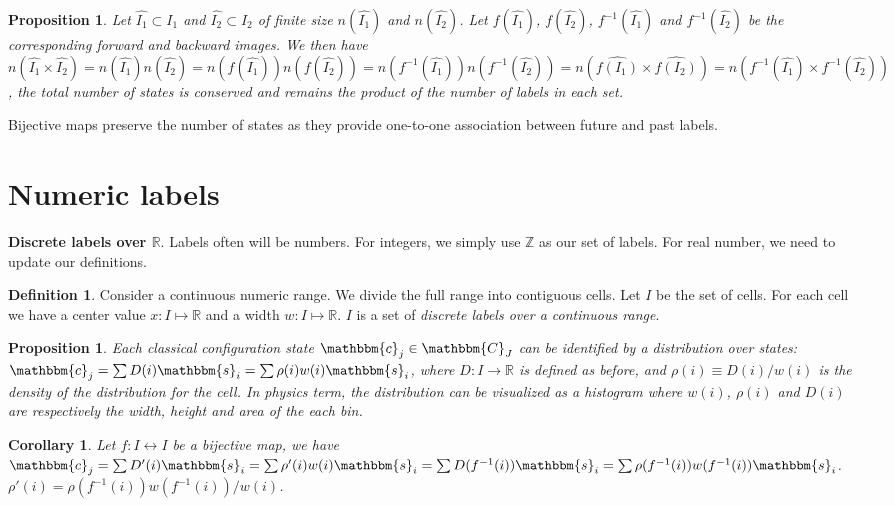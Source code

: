 \documentclass[twocolumn,floatfix,nofootinbib]{revtex4}   %
\theoremstyle{theorem}
\newtheorem{cor}[thm]{Corollary}
\newtheorem{prop}[thm]{Proposition}
\theoremstyle{definition}
\newtheorem{defn}[thm]{Definition}
\begin{document}
\begin{prop}\label{labelsMultiCount}
Let $\hat{I_1} \subset I_1$ and $\hat{I_2} \subset I_2$ of finite size $n(\hat{I_1})$ and $n(\hat{I_2})$. Let $f(\hat{I_1})$, $f(\hat{I_2})$, $f^{-1}(\hat{I_1})$ and $f^{-1}(\hat{I_2})$ be the corresponding forward and backward images. We then have $n(\hat{I_1}\times\hat{I_2})=n(\hat{I_1})n(\hat{I_2})=n(f(\hat{I_1})) n(f(\hat{I_2}))=n(f^{-1}(\hat{I_1})) n(f^{-1}(\hat{I_2}))=n(\hat{f(I_1)}\times\hat{f(I_2)})=n(f^{-1}(\hat{I_1})\times f^{-1}(\hat{I_2}))$, the total number of states is conserved and remains the product of the number of labels in each set.
\end{prop}

Bijective maps preserve the number of states as they provide one-to-one association between future and past labels.

\section{Numeric labels}

\textbf{Discrete labels over $\mathbb{R}$}. Labels often will be numbers. For integers, we simply use $\mathbb{Z}$ as our set of labels. For real number, we need to update our definitions.

\begin{defn}\label{disclabelsoverr}
Consider a continuous numeric range. We divide the full range into contiguous cells. Let $I$ be the set of cells. For each cell we have a center value $x: I \mapsto \mathbb{R}$ and a width $w: I \mapsto \mathbb{R}$. $I$ is a set of \emph{discrete labels over a continuous range}.
\end{defn}

\begin{prop}\label{disclabelsoverrdist}
Each classical configuration state $\mathbbm{c}_j \in \mathbbm{C}_J$ can be identified by a distribution over states: $\mathbbm{c}_j=\sum D(i) \mathbbm{s}_i=\sum \rho(i) w(i) \mathbbm{s}_i$, where $D:I\rightarrow\mathbb{R}$ is defined as before, and $\rho(i)\equiv D(i) / w(i)$ is the density of the distribution for the cell. In physics term, the distribution can be visualized as a histogram where $w(i)$, $\rho(i)$ and $D(i)$ are respectively the width, height and area of the each bin.
\end{prop}

\begin{cor}\label{discreteEv}
Let $f: I \leftrightarrow I$ be a bijective map, we have $\mathbbm{c}_j=\sum D'(i) \mathbbm{s}_i=\sum \rho'(i) w(i) \mathbbm{s}_i = \sum D(f^{-1}(i)) \mathbbm{s}_i = \sum \rho(f^{-1}(i)) w(f^{-1}(i)) \mathbbm{s}_i$. $\rho'(i) = \rho(f^{-1}(i)) w(f^{-1}(i)) / w(i)$.
\end{cor}
\end{document}
